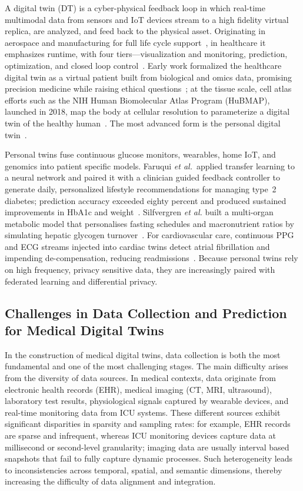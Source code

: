 \documentclass[journal]{IEEEtran}
\begin{document}
A digital twin (DT) is a cyber-physical feedback loop in which real-time multimodal data from sensors and IoT devices stream to a high fidelity virtual replica, are analyzed, and feed back to the physical asset. Originating in aerospace and manufacturing for full life cycle support~\cite{Tao2018}, in healthcare it emphasizes runtime, with four tiers---visualization and monitoring, prediction, optimization, and closed loop control~\cite{NIST2021,sun2023digitaltwin}. Early work formalized the healthcare digital twin as a virtual patient built from biological and omics data, promising precision medicine while raising ethical questions~\cite{Bruynseels2018DigitalTwins}; at the tissue scale, cell atlas efforts such as the NIH Human Biomolecular Atlas Program (HuBMAP), launched in 2018, map the body at cellular resolution to parameterize a digital twin of the healthy human~\cite{HuBMAP2019}. The most advanced form is the personal digital twin~\cite{deKerckhove2021}.

Personal twins fuse continuous glucose monitors, wearables, home IoT, and genomics into patient specific models. Faruqui \emph{et al.}\ applied transfer learning to a neural network and paired it with a clinician guided feedback controller to generate daily, personalized lifestyle recommendations for managing type 2 diabetes; prediction accuracy exceeded eighty percent and produced sustained improvements in HbA1c and weight~\cite{Faruqui2024}. Silfvergren \emph{et al.} built a multi-organ metabolic model that personalises fasting schedules and macronutrient ratios by simulating hepatic glycogen turnover \cite{Silfvergren2022}. For cardiovascular care, continuous PPG and ECG streams injected into cardiac twins detect atrial fibrillation and impending de-compensation, reducing readmissions \cite{Bayoumy2021,Williams2023}. Because personal twins rely on high frequency, privacy sensitive data, they are increasingly paired with federated learning and differential privacy.



\subsection{Challenges in Data Collection and Prediction for Medical Digital Twins}

In the construction of medical digital twins, data collection is both the most fundamental and one of the most challenging stages. The main difficulty arises from the diversity of data sources. In medical contexts, data originate from electronic health records (EHR), medical imaging (CT, MRI, ultrasound), laboratory test results, physiological signals captured by wearable devices, and real-time monitoring data from ICU systems. These different sources exhibit significant disparities in sparsity and sampling rates: for example, EHR records are sparse and infrequent, whereas ICU monitoring devices capture data at millisecond or second-level granularity; imaging data are usually interval based snapshots that fail to fully capture dynamic processes. Such heterogeneity leads to inconsistencies across temporal, spatial, and semantic dimensions, thereby increasing the difficulty of data alignment and integration.
\end{document}
